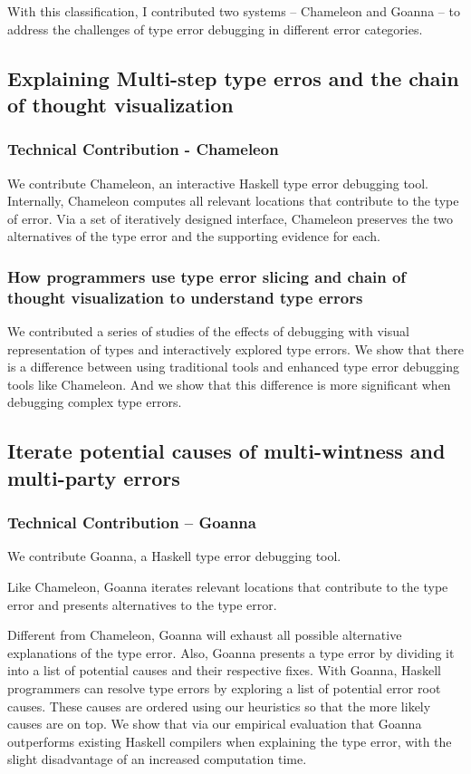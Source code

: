 With this classification, I contributed two systems -- Chameleon and Goanna -- to address the challenges of type error debugging in different error categories.

\subsection{Explaining Multi-step type erros and the chain of thought visualization}

\subsubsection{Technical Contribution - Chameleon}
We contribute Chameleon, an interactive Haskell type error debugging tool. Internally, Chameleon computes all relevant locations that contribute to the type of error. Via a set of iteratively designed interface, Chameleon preserves the two alternatives of the type error and the supporting evidence for each.

\subsubsection{How programmers use type error slicing and chain of thought visualization to understand type errors}
We  contributed a series of studies of the effects of debugging with visual representation of types and interactively explored type errors. We show that there is a difference between using traditional tools and enhanced type error debugging tools like Chameleon. And we show that this difference is more significant when debugging complex type errors.

\subsection{Iterate potential causes of multi-wintness and multi-party errors}

\subsubsection{Technical Contribution -- Goanna}

We contribute Goanna, a Haskell type error debugging tool. 

Like Chameleon, Goanna iterates relevant locations that contribute to the type error and presents alternatives to the type error. 

Different from Chameleon, Goanna will exhaust all possible alternative explanations of the type error. Also, Goanna presents a type error by dividing it into a list of potential causes and their respective fixes. With Goanna, Haskell programmers can resolve type errors by exploring a list of potential error root causes. These causes are ordered using our heuristics so that the more likely causes are on top. We show that via our empirical evaluation that Goanna outperforms existing Haskell compilers when explaining the type error, with the slight disadvantage of an increased computation time.


